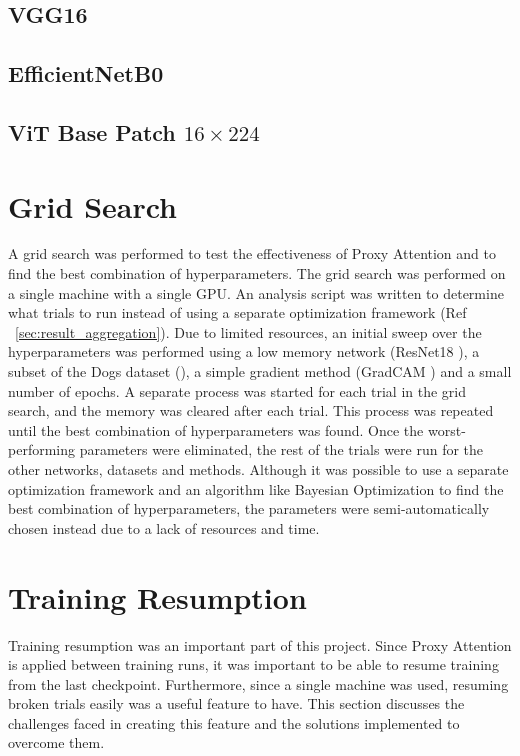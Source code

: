 \subsection{VGG16}
\subsection{EfficientNetB0}
\subsection{ViT Base Patch $16\times224$}

\section{Grid Search}
A grid search was performed to test the effectiveness of Proxy Attention and to find the best combination of hyperparameters. The grid search was performed on a single machine with a single GPU. An analysis script was written to determine what trials to run instead of using a separate optimization framework (Ref ~\ref{sec:result_aggregation}).
Due to limited resources, an initial sweep over the hyperparameters was performed using a low memory network (ResNet18 \cite{heDeepResidualLearning2016}), a subset of the Dogs dataset (\cite{khoslaNovelDatasetFineGrained}), a simple gradient method (GradCAM \cite{selvarajuGradCAMVisualExplanations}) and a small number of epochs. A separate process was started for each trial in the grid search, and the memory was cleared after each trial. This process was repeated until the best combination of hyperparameters was found. Once the worst-performing parameters were eliminated, the rest of the trials were run for the other networks, datasets and methods.
Although it was possible to use a separate optimization framework and an algorithm like Bayesian Optimization to find the best combination of hyperparameters, the parameters were semi-automatically chosen instead due to a lack of resources and time.

\section{Training Resumption}
Training resumption was an important part of this project. Since Proxy Attention is applied between training runs, it was important to be able to resume training from the last checkpoint. Furthermore, since a single machine was used, resuming broken trials easily was a useful feature to have. This section discusses the challenges faced in creating this feature and the solutions implemented to overcome them.

